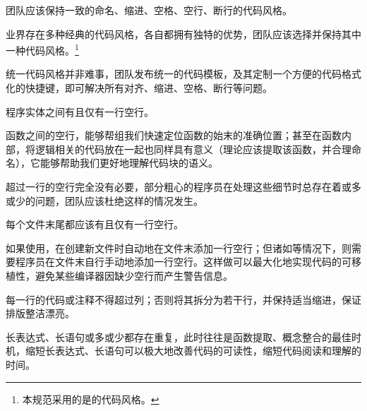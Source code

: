 \begin{content}

\begin{regulation}
团队应该保持一致的命名、缩进、空格、空行、断行的代码风格。
\end{regulation}

业界存在多种经典的代码风格，各自都拥有独特的优势，团队应该选择并保持其中一种代码风格。\footnote{本规范采用的是的代码风格。}

\begin{enum}
\end{enum}

统一代码风格并非难事，团队发布统一的代码模板，及其定制一个方便的代码格式化的快捷键，即可解决所有对齐、缩进、空格、断行等问题。

\begin{regulation}
程序实体之间有且仅有一行空行。
\end{regulation}

函数之间的空行，能够帮组我们快速定位函数的始末的准确位置；甚至在函数内部，将逻辑相关的代码放在一起也同样具有意义（理论应该提取该函数，并合理命名），它能够帮助我们更好地理解代码块的语义。

超过一行的空行完全没有必要，部分粗心的程序员在处理这些细节时总存在着或多或少的问题，团队应该杜绝这样的情况发生。

\begin{regulation}
每个文件末尾都应该有且仅有一行空行。
\end{regulation}

如果使用，在创建新文件时自动地在文件末添加一行空行；但诸如\cpp{}等情况下，则需要程序员在文件末自行手动地添加一行空行。这样做可以最大化地实现代码的可移植性，避免某些编译器因缺少空行而产生警告信息。

\begin{regulation}
每一行的代码或注释不得超过列；否则将其拆分为若干行，并保持适当缩进，保证排版整洁漂亮。
\end{regulation}

长表达式、长语句或多或少都存在重复，此时往往是函数提取、概念整合的最佳时机，缩短长表达式、长语句可以极大地改善代码的可读性，缩短代码阅读和理解的时间。

\end{content}
